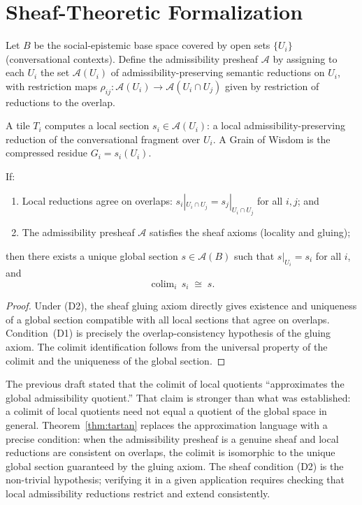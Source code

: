 \documentclass[12pt, a4paper, oneside]{book}
\DeclareMathOperator{\colim}{colim}
\begin{document}
\section{Sheaf-Theoretic Formalization}

\begin{definition}
\label{def:presheaf}
Let $B$ be the social-epistemic base space covered by open sets
$\{U_i\}$ (conversational contexts). Define the admissibility presheaf
$\mathscr{A}$ by assigning to each $U_i$ the set $\mathscr{A}(U_i)$ of
admissibility-preserving semantic reductions on $U_i$, with restriction
maps $\rho_{ij} : \mathscr{A}(U_i) \to \mathscr{A}(U_i \cap U_j)$
given by restriction of reductions to the overlap.
\end{definition}

\begin{definition}
A tile $T_i$ computes a local section $s_i \in \mathscr{A}(U_i)$:
a local admissibility-preserving reduction of the conversational fragment
over $U_i$. A Grain of Wisdom is the compressed residue $G_i = s_i(U_i)$.
\end{definition}

\begin{theorem}
\label{thm:tartan}
If:
\begin{enumerate}
  \item[(D1)] Local reductions agree on overlaps:
    $s_i|_{U_i \cap U_j} = s_j|_{U_i \cap U_j}$ for all $i, j$; and
  \item[(D2)] The admissibility presheaf $\mathscr{A}$ satisfies the
    sheaf axioms (locality and gluing);
\end{enumerate}
then there exists a unique global section $s \in \mathscr{A}(B)$
such that $s|_{U_i} = s_i$ for all $i$, and
\[
  \colim_{i}\, s_i \;\cong\; s.
\]
\end{theorem}

\begin{proof}
Under (D2), the sheaf gluing axiom directly gives existence and
uniqueness of a global section compatible with all local sections that
agree on overlaps. Condition~(D1) is precisely the overlap-consistency
hypothesis of the gluing axiom. The colimit identification follows from
the universal property of the colimit and the uniqueness of the global
section.
\end{proof}

\begin{remark}
The previous draft stated that the colimit of local quotients
``approximates the global admissibility quotient.'' That claim is
stronger than what was established: a colimit of local quotients need
not equal a quotient of the global space in general.
Theorem~\ref{thm:tartan} replaces the approximation language with a
precise condition: when the admissibility presheaf is a genuine sheaf
and local reductions are consistent on overlaps, the colimit is
isomorphic to the unique global section guaranteed by the gluing axiom.
The sheaf condition (D2) is the non-trivial hypothesis; verifying it in
a given application requires checking that local admissibility reductions
restrict and extend consistently.
\end{remark}
\end{document}
